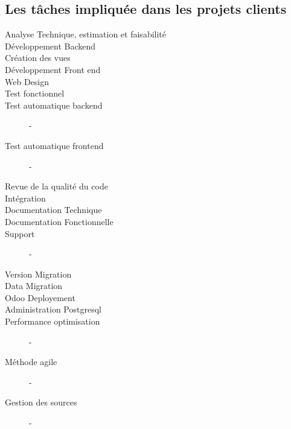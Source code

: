 \subsection{Les tâches impliquée dans les projets clients}
\begin{description}
    \item[Analyse Technique, estimation et faisabilité] 
    \item[Développement Backend]
    \item[Création des vues]
    \item[Développement Front end]
    \item[Web Design]
    \item[Test fonctionnel]
    \item[Test automatique backend] -
    \item[Test automatique frontend] -
    \item[Revue de la qualité du code]
    \item[Intégration]
    \item[Documentation Technique]
    \item[Documentation Fonctionnelle]
    \item[Support] -
    \item[Version Migration]
    \item[Data Migration]
    \item[Odoo Deployement]
    \item[Administration Postgresql]
    \item[Performance optimisation] - 
    \item[Méthode agile]       -
    \item[Gestion des sources] -
\end{description}
